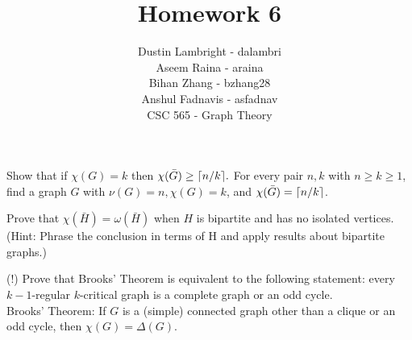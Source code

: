 \documentclass[12pt]{article}
\DeclarePairedDelimiter{\ceil}{\lceil}{\rceil}
\newenvironment{question}[2][Question]{\begin{trivlist}
\item[\hskip \labelsep {\bfseries #1}\hskip \labelsep {\bfseries #2.}]}{\end{trivlist}}
\begin{document}


\title{Homework 6}%
\author{Dustin Lambright - dalambri \\ Aseem Raina - araina \\ Bihan Zhang - bzhang28 \\ Anshul Fadnavis - asfadnav\\
CSC 565 - Graph Theory} %

\maketitle


\begin{question}{3}
Show that if $\chi(G) = k$ then $\chi(\bar{G}) \geq \ceil[big]{n/k}.$ For every pair $n, k$ with $n \geq k \geq 1$, find a graph $G$ with $ν(G) = n, \chi(G) = k$, and $\chi(\bar{G}) = \ceil[big]{n/k}$.
\end{question}

\begin{question}{4}
Prove that $\chi(\bar{H}) = \omega(\bar{H})$ when $H$ is bipartite and has no isolated vertices. (Hint: Phrase the conclusion in terms of H and apply results about bipartite graphs.)
\end{question}

\begin{question}{5}
(!) Prove that Brooks' Theorem is equivalent to the following statement: every $k-1$-regular $k$-critical graph is a complete graph or an odd cycle.\\

Brooks' Theorem:
If $G$ is a (simple) connected graph other than a clique or an odd cycle, then $\chi(G) = \Delta(G)$.
\end{question}





\end{document}
